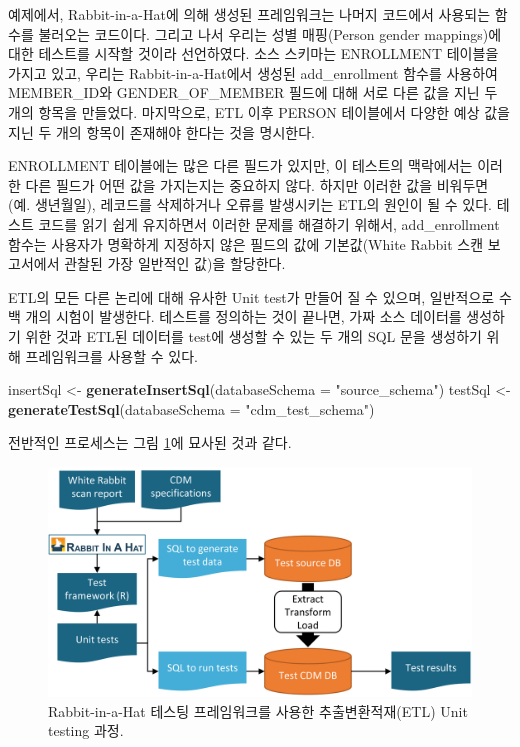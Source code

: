 \documentclass[11pt]{book}
\newenvironment{Shaded}{\begin{snugshade}}{\end{snugshade}}
\newcommand{\KeywordTok}[1]{\textcolor[rgb]{0.13,0.29,0.53}{\textbf{#1}}}
\newcommand{\DataTypeTok}[1]{\textcolor[rgb]{0.13,0.29,0.53}{#1}}
\newcommand{\StringTok}[1]{\textcolor[rgb]{0.31,0.60,0.02}{#1}}
\newcommand{\NormalTok}[1]{#1}
\theoremstyle{definition}
\theoremstyle{definition}
\theoremstyle{definition}
\theoremstyle{remark}
\begin{document}
예제에서, Rabbit-in-a-Hat에 의해 생성된 프레임워크는 나머지 코드에서
사용되는 함수를 불러오는 코드이다. 그리고 나서 우리는 성별 매핑(Person
gender mappings)에 대한 테스트를 시작할 것이라 선언하였다. 소스 스키마는
ENROLLMENT 테이블을 가지고 있고, 우리는 Rabbit-in-a-Hat에서 생성된
add\_enrollment 함수를 사용하여 MEMBER\_ID와 GENDER\_OF\_MEMBER 필드에
대해 서로 다른 값을 지닌 두 개의 항목을 만들었다. 마지막으로, ETL 이후
PERSON 테이블에서 다양한 예상 값을 지닌 두 개의 항목이 존재해야 한다는
것을 명시한다.

ENROLLMENT 테이블에는 많은 다른 필드가 있지만, 이 테스트의 맥락에서는
이러한 다른 필드가 어떤 값을 가지는지는 중요하지 않다. 하지만 이러한
값을 비워두면 (예. 생년월일), 레코드를 삭제하거나 오류를 발생시키는
ETL의 원인이 될 수 있다. 테스트 코드를 읽기 쉽게 유지하면서 이러한
문제를 해결하기 위해서, add\_enrollment 함수는 사용자가 명확하게
지정하지 않은 필드의 값에 기본값(White Rabbit 스캔 보고서에서 관찰된
가장 일반적인 값)을 할당한다.

ETL의 모든 다른 논리에 대해 유사한 Unit test가 만들어 질 수 있으며,
일반적으로 수백 개의 시험이 발생한다. 테스트를 정의하는 것이 끝나면,
가짜 소스 데이터를 생성하기 위한 것과 ETL된 데이터를 test에 생성할 수
있는 두 개의 SQL 문을 생성하기 위해 프레임워크를 사용할 수 있다.

\begin{Shaded}
\begin{Highlighting}[]
\NormalTok{insertSql <-}\StringTok{ }\KeywordTok{generateInsertSql}\NormalTok{(}\DataTypeTok{databaseSchema =} \StringTok{"source_schema"}\NormalTok{)}
\NormalTok{testSql <-}\StringTok{ }\KeywordTok{generateTestSql}\NormalTok{(}\DataTypeTok{databaseSchema =} \StringTok{"cdm_test_schema"}\NormalTok{)}
\end{Highlighting}
\end{Shaded}

전반적인 프로세스는 그림 \ref{fig:testFramework}에 묘사된 것과 같다.

\begin{figure}

{\centering \includegraphics[width=0.9\linewidth]{images/DataQuality/testFramework} 

}

\caption{Rabbit-in-a-Hat 테스팅 프레임워크를 사용한 추출변환적재(ETL) Unit testing 과정.}\label{fig:testFramework}
\end{figure}
\end{document}
